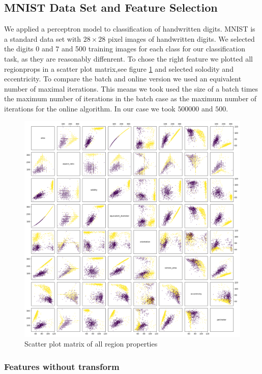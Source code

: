 \subsection{MNIST Data Set and Feature Selection}

We applied a perceptron model to classification of handwritten digits. MNIST is a standard data set with $28\times28$ pixel images of handwritten digits.
We selected the digits $0$ and $7$ and 500 training images for each class for our classification task, as they are reasonably diffenrent. To chose the right feature we plotted all regionprops in a scatter plot matrix,see figure \ref{perceptron:features} and selected solodity and eccentricity. To compare the batch and online version we used an equivalent number of maximal iterations. This means we took used the size of a batch times the maximum number of iterations in the batch case as the maximum number of iterations for the online algorithm. In our case we took $500000$ and $500$.

\begin{figure}
\includegraphics[width=\textwidth]{figures/scatter_matrix}
\caption{Scatter plot matrix of all region properties}
\label{perceptron:features}
\end{figure}

\subsubsection{Features without transform}

